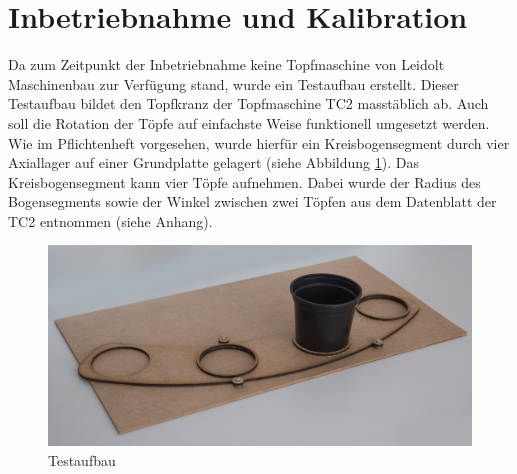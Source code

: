 \newpage
\section{Inbetriebnahme und Kalibration}

Da zum Zeitpunkt der Inbetriebnahme keine Topfmaschine von Leidolt Maschinenbau zur Verfügung stand, wurde ein Testaufbau erstellt. Dieser Testaufbau bildet den Topfkranz der Topfmaschine TC2 masstäblich ab. Auch soll die Rotation der Töpfe auf einfachste Weise funktionell umgesetzt werden. Wie im Pflichtenheft vorgesehen, wurde hierfür ein Kreisbogensegment durch vier Axiallager auf einer Grundplatte gelagert (siehe Abbildung \ref{fig:testaufbau}). Das Kreisbogensegment kann vier Töpfe aufnehmen. Dabei wurde der Radius des Bogensegments sowie der Winkel zwischen zwei Töpfen aus dem Datenblatt der TC2 entnommen (siehe Anhang). 

\begin{figure}[H]
	\includegraphics[width=1\textwidth]{Illustrationen/7-Inbetriebnahme_und_Kalibration/testaufbau.jpg}
	\caption{Testaufbau}
	\label{fig:testaufbau}
\end{figure}